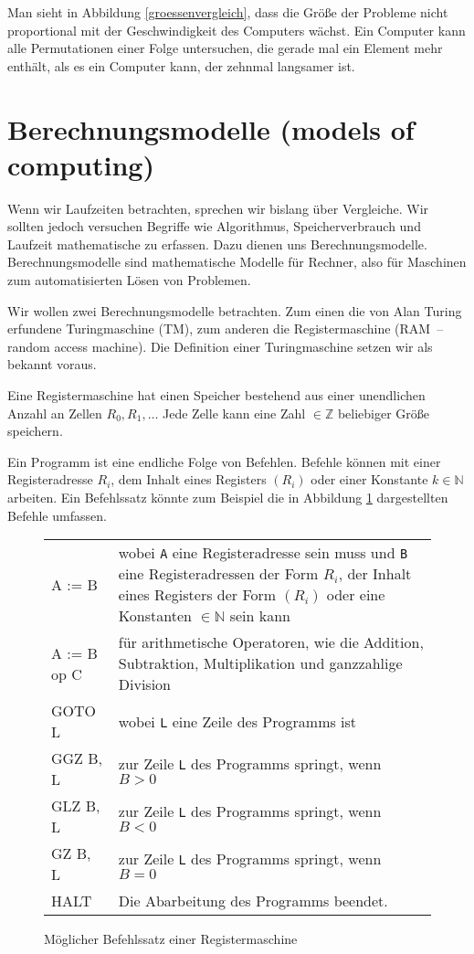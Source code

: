 Man sieht in Abbildung \ref{groessenvergleich}, dass die Größe der Probleme nicht proportional mit der Geschwindigkeit des Computers wächst. Ein Computer kann alle Permutationen einer Folge untersuchen, die gerade mal ein Element mehr enthält, als es ein Computer kann, der zehnmal langsamer ist.

\section{Berechnungsmodelle (models of computing)}
Wenn wir Laufzeiten betrachten, sprechen wir bislang über Vergleiche. Wir sollten jedoch versuchen Begriffe wie Algorithmus, Speicherverbrauch und Laufzeit mathematische zu erfassen. Dazu dienen uns Berechnungsmodelle. Berechnungsmodelle sind mathematische Modelle für Rechner, also für Maschinen zum automatisierten Lösen von Problemen.

Wir wollen zwei Berechnungsmodelle betrachten. Zum einen die von Alan Turing erfundene Turingmaschine (TM), zum anderen die Registermaschine (RAM~-- random access machine). Die Definition einer Turingmaschine setzen wir als bekannt voraus.

\begin{Def}
\hspace{\parindent}
Eine Registermaschine hat einen Speicher bestehend aus einer unendlichen Anzahl an Zellen $R_0, R_1, \ldots$ Jede Zelle kann eine Zahl $\in \mathbb{Z}$ beliebiger Größe speichern.

Ein Programm ist eine endliche Folge von Befehlen. Befehle können mit einer Registeradresse $R_i$, dem Inhalt eines Registers $(R_i)$ oder einer Konstante $k \in \mathbb{N}$ arbeiten. Ein Befehlssatz könnte zum Beispiel die in Abbildung \ref{rambefehle} dargestellten Befehle umfassen.
\begin{figure}[hbt]
  \centering
  \begin{tabular}{>{\ttfamily}l@{\qquad}p{20em}}
    A := B &  wobei \texttt{A} eine Registeradresse sein muss und \texttt{B} eine Registeradressen der Form $R_i$, der Inhalt eines Registers der Form $(R_i)$ oder eine Konstanten $\in \mathbb{N}$ sein kann\\
    A := B op C & für arithmetische Operatoren, wie die Addition, Subtraktion, Multiplikation und ganzzahlige Division \\
    GOTO L & wobei \texttt{L} eine Zeile des Programms ist \\
    GGZ B, L & zur Zeile \texttt{L} des Programms springt, wenn $B > 0$ \\
    GLZ B, L & zur Zeile \texttt{L} des Programms springt, wenn $B < 0$ \\
    GZ B, L & zur Zeile \texttt{L} des Programms springt, wenn $B = 0$ \\
    HALT & Die Abarbeitung des Programms beendet.
  \end{tabular}
  \caption{Möglicher Befehlssatz einer Registermaschine}
  \label{rambefehle}
\end{figure}
\end{Def}

